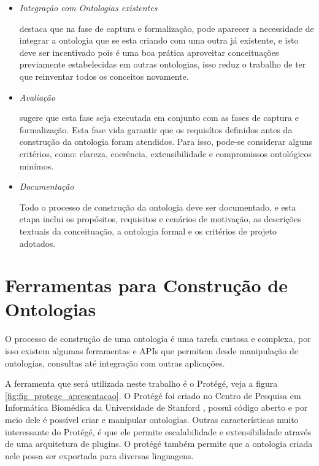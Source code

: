 \begin{itemize}
    \item \textit{Integração com Ontologias existentes}
    
    \cite{falbo1998integracao} destaca que na fase de captura e formalização,
    pode aparecer a necessidade de integrar a ontologia que se esta criando com
    uma outra já existente, e isto deve ser incentivado pois é uma boa prática 
    aproveitar conceituações previamente estabelecidas em outras ontologias, isso
    reduz o trabalho de ter que reinventar todos os conceitos novamente.
    
    \item \textit{Avaliação}
    
    \cite{guizzardidesenvolvimento} sugere que esta fase seja executada em 
    conjunto com as fases de captura e formalização. Esta fase vida garantir 
    que os requisítos definidos antes da construção da ontologia foram atendidos.
    Para isso, pode-se considerar alguns critérios, como: clareza, coerência, 
    extensibilidade e compromissos ontológicos minímos.
    
    \item \textit{Documentação}
    
    Todo o processo de construção da ontologia deve ser documentado, e esta etapa
    inclui os propósitos, requisitos e cenários de motivação, as descrições 
    textuais da conceituação, a ontologia formal e os critérios de projeto 
    adotados.
\end{itemize}

\section{Ferramentas para Construção de Ontologias}
\label{sec:ferramentas_para_construcao_de_ontologias}

O processo de construção de uma ontologia é uma tarefa custosa e complexa, por 
isso existem algumas ferramentas e APIs que permitem desde manipulação de 
ontologias, consultas até integração com outras aplicações.

A ferramenta que será utilizada neste trabalho é o Protégé, veja a figura 
\ref{fig:fig_protege_apresentacao}. O Protégé foi criado 
no Centro de Pesquisa em Informática Biomédica da Universidade de Stanford 
\cite{protege}, possui código aberto e por meio dele é possível criar e
manipular ontologias. Outras características muito interessante do Protégé, 
é que ele permite escalabilidade e extensibilidade através de uma arquitetura de 
plugins. O protégé também permite que a ontologia criada nele possa ser 
exportada para diversas linguagens.

